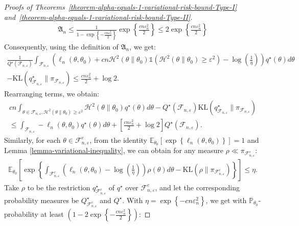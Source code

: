 \documentclass[12pt]{article}
\numberwithin{equation}{section}
\begin{document}
\begin{proof}[Proofs of Theorems~\ref{theorem-alpha-equals-1-variational-risk-bound-Type-I} and~\ref{theorem-alpha-equals-1-variational-risk-bound-Type-II}]
\begin{align}
    \mathfrak{A}_n \leq \frac{1}{1 - \exp\left\{-\frac{c n \varepsilon_n^2}{2}\right\}}\exp\left\{\frac{c n \varepsilon_n^2}{2}\right\} \leq 2 \exp\left\{\frac{c n \varepsilon_n^2}{2}\right\}
\end{align}
Consequently, using the definition of $\mathfrak{A}_n$, we get:
\begin{multline}\label{eq:hell-risk-lemma-12}
    \frac{1}{Q^{\star}(\mathcal{F}_{n, \varepsilon})}\int_{\mathcal{F}_{n, \varepsilon}}\left(\ell_n(\theta, \theta_0) + c n \mathcal{H}^{2}(\theta\parallel \theta_0) \mathds{1}(\mathcal{H}^{2}(\theta \parallel \theta_0) \geq \varepsilon^2) - \log \left(\frac{1}{\eta}\right)\right)q^{\star}(\theta)d\theta\\
    -\mathrm{KL}(q^{\star}_{\mathcal{F}_{n, \varepsilon}}\parallel \pi_{\mathcal{F}_{n, \varepsilon}}) \leq \frac{c n \varepsilon_n^2}{2} + \log 2.
\end{multline}
Rearranging terms, we obtain:
\begin{multline}\label{eq:hell-risk-lemma-13}
    c n \int_{\theta \in \mathcal{F}_{n, \varepsilon}, \mathcal{H}^{2}(\theta \parallel \theta_0) \geq \varepsilon^2}\mathcal{H}^{2}(\theta\parallel \theta_0) q^{\star}(\theta)d\theta - Q^{\star}(\mathcal{F}_{n, \varepsilon})\mathrm{KL}(q^{\star}_{\mathcal{F}_{n, \varepsilon}}\parallel \pi_{\mathcal{F}_{n, \varepsilon}})\\
    \leq \int_{\mathcal{F}_{n, \varepsilon}}-\ell_{n}(\theta, \theta_0)q^{\star}(\theta)d\theta + \left[\frac{c n \varepsilon_n^2}{2} + \log 2\right]Q^{\star}(\mathcal{F}_{n, \varepsilon}).
\end{multline}
Similarly, for each $\theta \in \mathcal{F}_{n, \varepsilon}^{c}$, from the identity $\mathbb{E}_{\theta_0}\left[\exp\left\{\ell_{n}(\theta, \theta_0)\right\}\right] = 1$ and Lemma \ref{lemma-variational-inequality}, we can obtain for any measure $\rho \ll \pi_{\mathcal{F}_{n, \varepsilon}^{c}}$:
\begin{align}\label{eq:hell-risk-lemma-14}
\mathbb{E}_{\theta_0}\left[\exp\left\{\int_{\mathcal{F}_{n, \varepsilon}^{c}}\left(\ell_n(\theta, \theta_0) - \log \left(\frac{1}{\eta}\right)\right)\rho(\theta)d\theta - \mathrm{KL}(\rho \parallel \pi_{\mathcal{F}^{c}_{n, \varepsilon}})\right\}\right] \leq \eta.
\end{align}
Take $\rho$ to be the restriction $q^{\star}_{\mathcal{F}^{c}_{n, \varepsilon}}$ of $q^{\star}$ over $\mathcal{F}^{c}_{n, \varepsilon}$, and let the corresponding probability measures be $Q^{\star}_{\mathcal{F}^{c}_{n, \varepsilon}}$ and $Q^{\star}$. With $\eta = \exp\left\{-c n \varepsilon_n^2\right\}$, we get with $\mathbb{P}_{\theta_0}$-probability at least $\left(1 - 2\exp\left\{-\tfrac{c n \varepsilon_n^2}{2}\right\}\right)$:

\end{proof}
\end{document}
